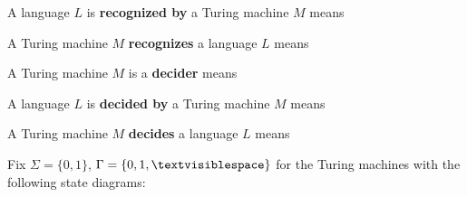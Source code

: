 \documentclass[12pt, oneside]{article}
\begin{document}
A language $L$ is {\bf recognized by} a Turing machine $M$ means

\vfill

A Turing  machine  $M$ {\bf  recognizes} a language $L$ means

\vfill

A Turing machine $M$ is a {\bf decider}  means

\vfill

A language  $L$ is {\bf decided by} a Turing  machine  $M$  means

\vfill

A  Turing machine $M$ {\bf decides} a language $L$ means

\vfill

Fix $\Sigma = \{0,1\}$, $\Gamma = \{ 0, 1, \textvisiblespace\}$ for the Turing machines with  the following state diagrams:
  
\end{document}
